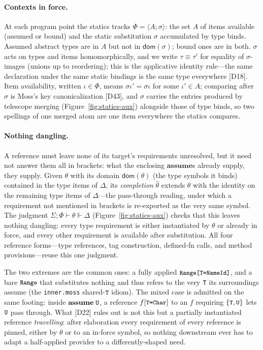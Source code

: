 \documentclass[10pt]{article}
\newcommand{\kw}[1]{\mathbf{#1}}          %
\newcommand{\ksf}[1]{\mathsf{#1}}         %
\newcommand{\thh}{\hat\theta}
\newcommand{\entails}{\Vdash}
\newcommand{\dom}{\ksf{dom}}
\newcommand{\smallcode}[1]{\texttt{\small #1}}
\theoremstyle{plain}
\theoremstyle{remark}
\begin{document}
\paragraph{Contexts in force.}
At each program point the statics tracks $\Phi = \langle A; \sigma
\rangle$: the set $A$ of items available (assumed or bound) and the
static substitution $\sigma$ accumulated by type binds. Assumed abstract
types are in $A$ but not in $\dom(\sigma)$; bound ones are in both.
$\sigma$ acts on types and items homomorphically, and we write $\tau
\equiv \tau'$ for equality of $\sigma$-images (unions up to reordering);
this is the applicative identity rule---the same declaration under the
same static bindings is the same type everywhere [D18]. Item
availability, written $\iota \in \Phi$, means $\sigma\iota' = \sigma\iota$
for some $\iota' \in A$; comparing after $\sigma$ is Moss's key
canonicalization [D43], and $\sigma$ carries the entries produced by
telescope merging (Figure~\ref{fig:statics-aux}) alongside those of type
binds, so
two spellings of one merged atom are one item everywhere the statics
compares.

\paragraph{Nothing dangling.}
A reference must leave none of its target's requirements unresolved, but
it need not answer them all in brackets: what the enclosing
$\kw{assume}$s already supply, they supply. Given $\theta$ with its
domain $\dom(\theta)$ (the type symbols it binds) contained in the type
items of $\Delta$, its \emph{completion} $\thh$ extends $\theta$ with the
identity on the remaining type items of $\Delta$---the pass-through
reading, under which a requirement not mentioned in brackets is
re-exported as the very same symbol. The judgment
$\Sigma;\Phi \vdash \theta \entails \Delta$
(Figure~\ref{fig:statics-aux}) checks that this leaves nothing dangling:
every type requirement is either instantiated by $\theta$ or already in
force, and every other requirement is available after substitution. All
four reference forms---type references, tag construction, defined-fn
calls, and method provisions---reuse this one judgment.

The two extremes are the common ones: a fully applied
$\smallcode{Range[T=NameId]}$, and a bare $\smallcode{Range}$ that
substitutes nothing and thus refers to the very $\smallcode{T}$ its
surroundings assume (the \texttt{inner.moss} shared-$\smallcode{T}$
idiom). The mixed case is admitted on the same footing: inside
$\kw{assume}\;\smallcode{U}$, a reference $f[\smallcode{T=Char}]$ to an
$f$ requiring $\{\smallcode{T},\smallcode{U}\}$ lets $\smallcode{U}$ pass
through. What [D22] rules out is not this but a partially instantiated
reference \emph{travelling}: after elaboration every requirement of every
reference is pinned, either by $\theta$ or to an in-force symbol, so
nothing downstream ever has to adapt a half-applied provider to a
differently-shaped need.
\end{document}
